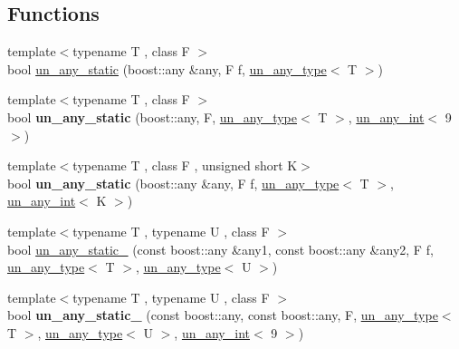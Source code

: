 \subsection*{Functions}
\begin{DoxyCompactItemize}
\item 
{\footnotesize template$<$typename T , class F $>$ }\\bool \mbox{\hyperlink{group__boost__any__stuff_ga8ec1a694aa7a5fa58ab801c1ea419fa8}{un\+\_\+any\+\_\+static}} (boost\+::any \&any, F f, \mbox{\hyperlink{struct_s_m_spp__di__unipi__it_1_1un__any__type}{un\+\_\+any\+\_\+type}}$<$ T $>$)
\item 
\mbox{\label{group__boost__any__stuff_gaa5ad9ba07b8f4cfcf13a74dc88f5ee47}} 
{\footnotesize template$<$typename T , class F $>$ }\\bool {\bfseries un\+\_\+any\+\_\+static} (boost\+::any, F, \mbox{\hyperlink{struct_s_m_spp__di__unipi__it_1_1un__any__type}{un\+\_\+any\+\_\+type}}$<$ T $>$, \mbox{\hyperlink{struct_s_m_spp__di__unipi__it_1_1un__any__int}{un\+\_\+any\+\_\+int}}$<$ 9 $>$)
\item 
\mbox{\label{group__boost__any__stuff_gaf4ce4377c8ea168165351f40425bdfbb}} 
{\footnotesize template$<$typename T , class F , unsigned short K$>$ }\\bool {\bfseries un\+\_\+any\+\_\+static} (boost\+::any \&any, F f, \mbox{\hyperlink{struct_s_m_spp__di__unipi__it_1_1un__any__type}{un\+\_\+any\+\_\+type}}$<$ T $>$, \mbox{\hyperlink{struct_s_m_spp__di__unipi__it_1_1un__any__int}{un\+\_\+any\+\_\+int}}$<$ K $>$)
\item 
{\footnotesize template$<$typename T , typename U , class F $>$ }\\bool \mbox{\hyperlink{group__boost__any__stuff_ga69348da148035f5453d7c1db28f0578b}{un\+\_\+any\+\_\+static\+\_}} (const boost\+::any \&any1, const boost\+::any \&any2, F f, \mbox{\hyperlink{struct_s_m_spp__di__unipi__it_1_1un__any__type}{un\+\_\+any\+\_\+type}}$<$ T $>$, \mbox{\hyperlink{struct_s_m_spp__di__unipi__it_1_1un__any__type}{un\+\_\+any\+\_\+type}}$<$ U $>$)
\item 
\mbox{\label{group__boost__any__stuff_gab0342de883748b3decaab79c853bad90}} 
{\footnotesize template$<$typename T , typename U , class F $>$ }\\bool {\bfseries un\+\_\+any\+\_\+static\+\_} (const boost\+::any, const boost\+::any, F, \mbox{\hyperlink{struct_s_m_spp__di__unipi__it_1_1un__any__type}{un\+\_\+any\+\_\+type}}$<$ T $>$, \mbox{\hyperlink{struct_s_m_spp__di__unipi__it_1_1un__any__type}{un\+\_\+any\+\_\+type}}$<$ U $>$, \mbox{\hyperlink{struct_s_m_spp__di__unipi__it_1_1un__any__int}{un\+\_\+any\+\_\+int}}$<$ 9 $>$)

\end{DoxyCompactItemize}
